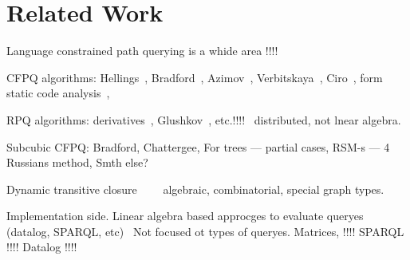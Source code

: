 \section{Related Work}

Language constrained path querying is a whide area !!!!

CFPQ algorithms: Hellings~\cite{!!!}, Bradford~\cite{!!!}, Azimov~\cite{!!!}, Verbitskaya~\cite{!!!}, Ciro~\cite{!!!}, form static code analysis~\cite{!!!}, 

RPQ algorithms: derivatives~\cite{!!!}, Glushkov~\cite{!!!}, etc.!!!!~\cite{!!!} distributed, not lnear algebra.

Subcubic CFPQ: Bradford, Chattergee, For trees --- partial cases, RSM-s --- 4 Russians method, Smth else? 

Dynamic transitive closure~\cite{!!!}~\cite{!!!}~\cite{!!!}~\cite{!!!} algebraic, combinatorial, special graph types.

Implementation side. 
Linear algebra based approcges to evaluate queryes (datalog, SPARQL, etc)~\cite{!!!} Not focused ot types of queryes.
Matrices, !!!!
SPARQL !!!!
Datalog !!!!